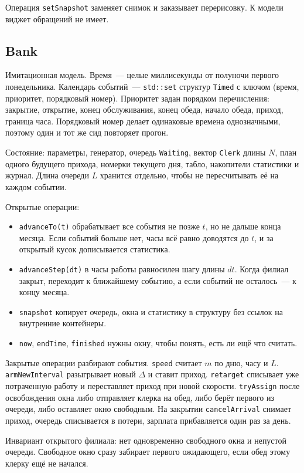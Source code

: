 \documentclass[a4paper,12pt]{article}
\begin{document}
Операция \texttt{setSnapshot} заменяет снимок и заказывает перерисовку. К модели виджет обращений не имеет.

\subsection*{Bank}
Имитационная модель. Время~--- целые миллисекунды от полуночи первого понедельника. Календарь событий~--- \texttt{std::set} структур \texttt{Timed} с ключом (время, приоритет, порядковый номер). Приоритет задан порядком перечисления: закрытие, открытие, конец обслуживания, конец обеда, начало обеда, приход, граница часа. Порядковый номер делает одинаковые времена однозначными, поэтому один и тот же сид повторяет прогон.

Состояние: параметры, генератор, очередь \texttt{Waiting}, вектор \texttt{Clerk} длины \(N\), план одного будущего прихода, номерки текущего дня, табло, накопители статистики и журнал. Длина очереди \(L\) хранится отдельно, чтобы не пересчитывать её на каждом событии.

Открытые операции:
\begin{itemize}
  \item \texttt{advanceTo(t)} обрабатывает все события не позже \(t\), но не дальше конца месяца. Если событий больше нет, часы всё равно доводятся до \(t\), и за открытый кусок дописывается статистика.
  \item \texttt{advanceStep(dt)} в часы работы равносилен шагу длины \(dt\). Когда филиал закрыт, переходит к ближайшему событию, а если событий не осталось~--- к концу месяца.
  \item \texttt{snapshot} копирует очередь, окна и статистику в структуру без ссылок на внутренние контейнеры.
  \item \texttt{now}, \texttt{endTime}, \texttt{finished} нужны окну, чтобы понять, есть ли ещё что считать.
\end{itemize}

Закрытые операции разбирают события. \texttt{speed} считает \(m\) по дню, часу и \(L\). \texttt{armNewInterval} разыгрывает новый \(\Delta\) и ставит приход. \texttt{retarget} списывает уже потраченную работу и переставляет приход при новой скорости. \texttt{tryAssign} после освобождения окна либо отправляет клерка на обед, либо берёт первого из очереди, либо оставляет окно свободным. На закрытии \texttt{cancelArrival} снимает приход, очередь списывается в потери, зарплата прибавляется один раз за день.

Инвариант открытого филиала: нет одновременно свободного окна и непустой очереди. Свободное окно сразу забирает первого ожидающего, если обед этому клерку ещё не начался.
\end{document}
